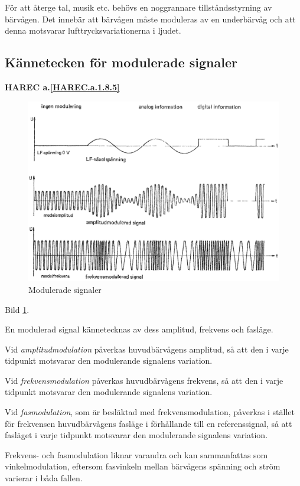 För att återge tal, musik etc. behövs en noggrannare tillståndsstyrning av
bärvågen. Det innebär att bärvågen måste moduleras av en underbärvåg och att
denna motsvarar lufttrycksvariationerna i ljudet.

\subsection{Kännetecken för modulerade signaler}
\textbf{HAREC a.\ref{HAREC.a.1.8.5}\label{myHAREC.a.1.8.5a}}

\begin{figure}
\includegraphics[width=\textwidth]{images/cropped_pdfs/bild_2_1-22.pdf}
\caption{Modulerade signaler}
\label{fig:BildII1-22}
\end{figure}

Bild \ref{fig:BildII1-22}.

En modulerad signal kännetecknas av dess amplitud, frekvens och fasläge.

Vid \emph{amplitudmodulation} påverkas huvudbärvågens amplitud, så att den i
varje tidpunkt motsvarar den modulerande signalens variation.

Vid \emph{frekvensmodulation} påverkas huvudbärvågens frekvens, så att den i
varje tidpunkt motsvarar den modulerande signalens variation.

Vid \emph{fasmodulation}, som är besläktad med frekvensmodulation, påverkas i
stället för frekvensen huvudbärvågens fasläge i förhållande till en
referenssignal, så att fasläget i varje tidpunkt motsvarar den modulerande
signalens variation.

Frekvens- och fasmodulation liknar varandra och kan sammanfattas som
vinkelmodulation, eftersom fasvinkeln mellan bärvågens spänning och ström
varierar i båda fallen.

